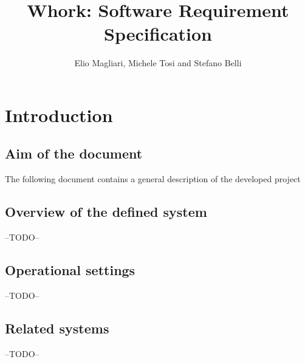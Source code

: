 \documentclass[12pt, a4paper]{article}
\title{Whork: Software Requirement Specification}
\author{Elio Magliari, Michele Tosi and Stefano Belli}
\begin{document}
\maketitle
\section{Introduction}
\subsection{Aim of the document}
The following document contains a general description of the developed project
\subsection{Overview of the defined system}
--TODO--
\subsection{Operational settings}
--TODO--
\subsection{Related systems}
--TODO--

\newpage
\end{document}
